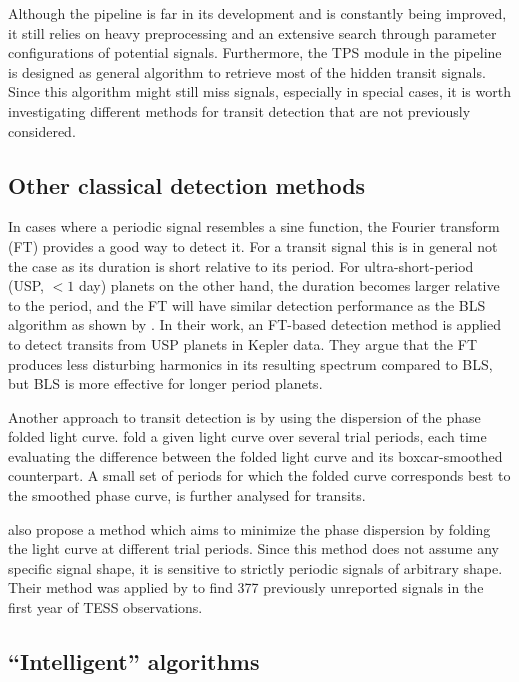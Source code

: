 Although the pipeline is far in its development and is constantly being improved, it still relies on heavy preprocessing and an extensive search through parameter configurations of potential signals. Furthermore, the TPS module in the pipeline is designed as general algorithm to retrieve most of the hidden transit signals. Since this algorithm might still miss signals, especially in special cases, it is worth investigating different methods for transit detection that are not previously considered.

\subsection{Other classical detection methods}

In cases where a periodic signal resembles a sine function, the Fourier transform (FT) provides a good way to detect it. For a transit signal this is in general not the case as its duration is short relative to its period. For ultra-short-period (USP, $< 1$ day) planets on the other hand, the duration becomes larger relative to the period, and the FT will have similar detection performance as the BLS algorithm as shown by \cite{sanchis2014study}. In their work, an FT-based detection method is applied to detect transits from USP planets in Kepler data. They argue that the FT produces less disturbing harmonics in its resulting spectrum compared to BLS, but BLS is more effective for longer period planets. 

Another approach to transit detection is by using the dispersion of the phase folded light curve. \cite{plavchan2008near} fold a given light curve over several trial periods, each time evaluating the difference between the folded light curve and its boxcar-smoothed counterpart. A small set of periods for which the folded curve corresponds best to the smoothed phase curve, is further analysed for transits.
   
\cite{wheeler2019weird} also propose a method which aims to minimize the phase dispersion by folding the light curve at different trial periods. Since this method does not assume any specific signal shape, it is sensitive to strictly periodic signals of arbitrary shape. Their method was applied by \cite{chakraborty2020hundreds} to find 377 previously unreported signals in the first year of TESS observations.

\subsection{``Intelligent'' algorithms}

